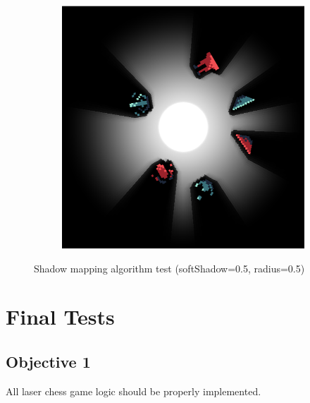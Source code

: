 \documentclass[../main/main.tex]{subfiles}
\begin{document}
\begin{figure}[H]
\begin{subfigure}[b]{0.3\columnwidth}
    \end{subfigure}
    \begin{subfigure}[b]{0.3\columnwidth}
    \includegraphics[width=\columnwidth]{../testing/assets/rays_example_3.png}
    \end{subfigure}

    \caption{Shadow mapping algorithm test (softShadow=0.5, radius=0.5)}
    \label{fig:rays-examples}
\end{figure}

\section{Final Tests}
\subsection{Objective 1}
All laser chess game logic should be properly implemented.

\end{document}
